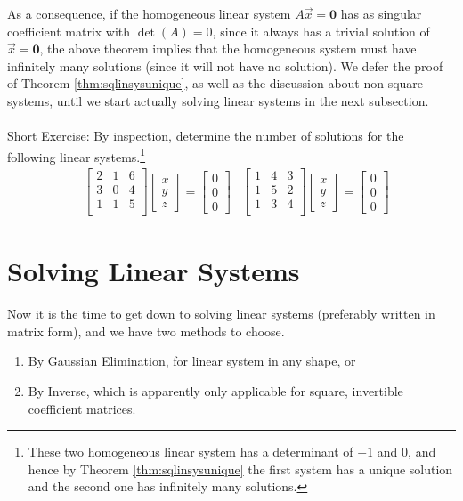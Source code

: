 As a consequence, if the homogeneous linear system $A\vec{x} = \textbf{0}$ has as singular coefficient matrix with $\det(A) = 0$, since it always has a trivial solution of $\vec{x} = \textbf{0}$, the above theorem implies that the homogeneous system must have infinitely many solutions (since it will not have no solution). We defer the proof of Theorem \ref{thm:sqlinsysunique}, as well as the discussion about non-square systems, until we start actually solving linear systems in the next subsection. \\
\\
Short Exercise: By inspection, determine the number of solutions for the following linear systems.\footnote{These two homogeneous linear system has a determinant of $-1$ and $0$, and hence by Theorem \ref{thm:sqlinsysunique} the first system has a unique solution and the second one has infinitely many solutions.}
\begin{align*}
&
\begin{bmatrix}
2 & 1 & 6 \\
3 & 0 & 4 \\
1 & 1 & 5 \\
\end{bmatrix}
\begin{bmatrix}
x \\
y \\
z
\end{bmatrix}
=
\begin{bmatrix}
0 \\
0 \\
0
\end{bmatrix}
&
\begin{bmatrix}
1 & 4 & 3 \\
1 & 5 & 2 \\
1 & 3 & 4 \\
\end{bmatrix}
\begin{bmatrix}
x \\
y \\
z
\end{bmatrix}
=
\begin{bmatrix}
0 \\
0 \\
0
\end{bmatrix}
\end{align*}

\section{Solving Linear Systems}
\label{section:SolveLinSys}
Now it is the time to get down to solving linear systems (preferably written in matrix form), and we have two methods to choose.
\begin{enumerate}
\item By Gaussian Elimination, for linear system in any shape, or
\item By Inverse, which is apparently only applicable for square, invertible coefficient matrices.
\end{enumerate}

